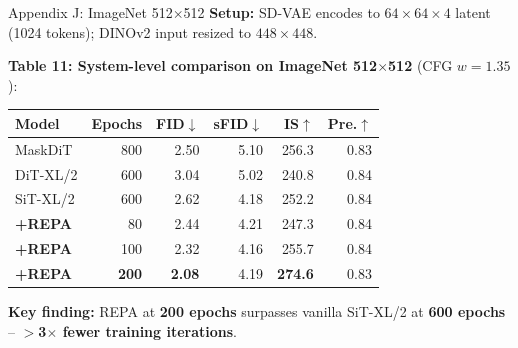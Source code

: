 \documentclass[aspectratio=169, 10pt]{beamer}
\begin{document}
\begin{frame}{Appendix J: ImageNet 512$\times$512}
\small
\textbf{Setup:} SD-VAE encodes to $64{\times}64{\times}4$ latent (1024 tokens); DINOv2 input resized to $448{\times}448$.

\vspace{0.3em}
\textbf{Table 11: System-level comparison on ImageNet 512$\times$512} (CFG $w{=}1.35$):

\vspace{0.2em}
\begin{center}
\begin{tabular}{lrrrrr}
\toprule
\textbf{Model} & \textbf{Epochs} & \textbf{FID$\downarrow$} & \textbf{sFID$\downarrow$} & \textbf{IS$\uparrow$} & \textbf{Pre.$\uparrow$} \\
\midrule
MaskDiT       & 800 & 2.50 & 5.10 & 256.3 & 0.83 \\
DiT-XL/2      & 600 & 3.04 & 5.02 & 240.8 & 0.84 \\
SiT-XL/2      & 600 & 2.62 & 4.18 & 252.2 & 0.84 \\
\midrule
\textbf{+REPA} &  80 & 2.44 & 4.21 & 247.3 & 0.84 \\
\textbf{+REPA} & 100 & 2.32 & 4.16 & 255.7 & 0.84 \\
\textbf{+REPA} & \textbf{200} & \textbf{2.08} & 4.19 & \textbf{274.6} & 0.83 \\
\bottomrule
\end{tabular}
\end{center}

\vspace{0.3em}
\textbf{Key finding:} REPA at \textbf{200 epochs} surpasses vanilla SiT-XL/2 at \textbf{600 epochs} -- \textbf{$>$3$\times$ fewer training iterations}.
\end{frame}
\end{document}

